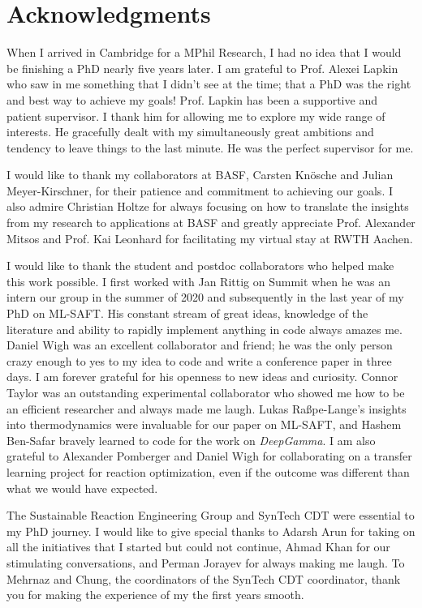 
\chapter*{Acknowledgments}
When I arrived in Cambridge for a MPhil Research, I had no idea that I would be finishing a PhD nearly five years later. I am grateful to Prof. Alexei Lapkin who saw in me something that I didn't see at the time; that a PhD was the right and best way to achieve my goals! Prof. Lapkin has been a supportive and patient supervisor. I thank him for allowing me to explore my wide range of interests. He gracefully dealt with my simultaneously great ambitions and tendency to leave things to the last minute. He was the perfect supervisor for me.

I would like to thank my collaborators at BASF, Carsten Kn\"osche and Julian Meyer-Kirschner, for their patience and commitment to achieving our goals. I also admire Christian Holtze for always focusing on how to translate the insights from my research to applications at BASF and greatly appreciate Prof. Alexander Mitsos and Prof. Kai Leonhard for facilitating my virtual stay at RWTH Aachen.

I would like to thank the student and postdoc collaborators who helped make this work possible. I first worked with Jan Rittig on Summit when he was an intern our group in the summer of 2020 and subsequently in the last year of my PhD on ML-SAFT. His constant stream of great ideas, knowledge of the literature and ability to rapidly implement anything in code always amazes me. Daniel Wigh was an excellent collaborator and friend; he was the only person crazy enough to yes to my idea to code and write a conference paper in three days. I am forever grateful for his openness to new ideas and curiosity. Connor Taylor was an outstanding experimental collaborator who showed me how to be an efficient researcher and always made me laugh. Lukas Ra{\ss}pe-Lange's insights into thermodynamics were invaluable for our paper on ML-SAFT, and Hashem Ben-Safar bravely learned to code for the work on \textit{DeepGamma}. I am also grateful to Alexander Pomberger and Daniel Wigh for collaborating on a transfer learning project for reaction optimization, even if the outcome was different than what we would have expected.

The Sustainable Reaction Engineering Group and SynTech CDT were essential to my PhD journey. I would like to give special thanks to Adarsh Arun for taking on all the initiatives that I started but could not continue, Ahmad Khan for our stimulating conversations, and Perman Jorayev for always making me laugh. To Mehrnaz and Chung, the coordinators of the SynTech CDT coordinator, thank you for making the experience of my the first years smooth.

